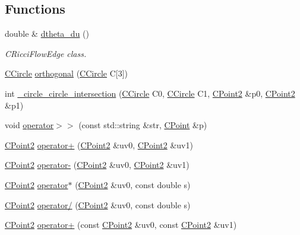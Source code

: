 \subsection*{Functions}
\begin{DoxyCompactItemize}
\item 
double \& \hyperlink{namespace_mesh_lib_a7c52b467ab87ddda5e6fe7b6d0a25148}{dtheta\+\_\+du} ()
\begin{DoxyCompactList}\small\item\em C\+Ricci\+Flow\+Edge class. \end{DoxyCompactList}\item 
\hyperlink{class_mesh_lib_1_1_c_circle}{C\+Circle} \hyperlink{namespace_mesh_lib_ab6a6d932f384fb9578367cefca9f3b38}{orthogonal} (\hyperlink{class_mesh_lib_1_1_c_circle}{C\+Circle} C\mbox{[}3\mbox{]})
\item 
int \hyperlink{namespace_mesh_lib_a072ef33d5d14e9cc879d55884baef73f}{\+\_\+circle\+\_\+circle\+\_\+intersection} (\hyperlink{class_mesh_lib_1_1_c_circle}{C\+Circle} C0, \hyperlink{class_mesh_lib_1_1_c_circle}{C\+Circle} C1, \hyperlink{class_mesh_lib_1_1_c_point2}{C\+Point2} \&p0, \hyperlink{class_mesh_lib_1_1_c_point2}{C\+Point2} \&p1)
\item 
void \hyperlink{namespace_mesh_lib_a6697ead353dba659c806ddcfb0baf487}{operator$>$$>$} (const std\+::string \&str, \hyperlink{class_mesh_lib_1_1_c_point}{C\+Point} \&p)
\item 
\hyperlink{class_mesh_lib_1_1_c_point2}{C\+Point2} \hyperlink{namespace_mesh_lib_aeacba552862f8445b222e130ff81f578}{operator+} (\hyperlink{class_mesh_lib_1_1_c_point2}{C\+Point2} \&uv0, \hyperlink{class_mesh_lib_1_1_c_point2}{C\+Point2} \&uv1)
\item 
\hyperlink{class_mesh_lib_1_1_c_point2}{C\+Point2} \hyperlink{namespace_mesh_lib_a06843ee204e7d5adb0f8709c0388b52f}{operator-\/} (\hyperlink{class_mesh_lib_1_1_c_point2}{C\+Point2} \&uv0, \hyperlink{class_mesh_lib_1_1_c_point2}{C\+Point2} \&uv1)
\item 
\hyperlink{class_mesh_lib_1_1_c_point2}{C\+Point2} \hyperlink{namespace_mesh_lib_ad2193c7504c0ea252000b503b887f977}{operator$\ast$} (\hyperlink{class_mesh_lib_1_1_c_point2}{C\+Point2} \&uv0, const double s)
\item 
\hyperlink{class_mesh_lib_1_1_c_point2}{C\+Point2} \hyperlink{namespace_mesh_lib_a9938d2b3974eb39cf1ec9067f9c0c48b}{operator/} (\hyperlink{class_mesh_lib_1_1_c_point2}{C\+Point2} \&uv0, const double s)
\item 
\hyperlink{class_mesh_lib_1_1_c_point2}{C\+Point2} \hyperlink{namespace_mesh_lib_ab3f63719ad0e28580cfbb25f9af38da7}{operator+} (const \hyperlink{class_mesh_lib_1_1_c_point2}{C\+Point2} \&uv0, const \hyperlink{class_mesh_lib_1_1_c_point2}{C\+Point2} \&uv1)

\end{DoxyCompactItemize}
